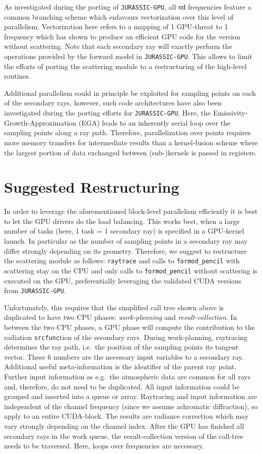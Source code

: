 \documentclass[12pt,a4paper,titlepage,twoside]{article}
\newcommand{\ttt}[1]{\texttt{#1}}
\begin{document}
As investigated during the porting of \ttt{JURASSIC-GPU}, all \ttt{nd} frequencies
feature a common branching scheme which enfavours vectorization over this level of
parallelism. Vectorization here refers to a mapping of 1 GPU-threat to 1 frequency
which has shown to produce an efficient GPU code for the version without scattering.
Note that each secondary ray will exactly perform the operations provided by
the forward model in \ttt{JURASSIC-GPU}.
This allows to limit the efforts of porting the scattering module
to a restructuring of the high-level routines.

Additional parallelism could in principle be exploited for sampling points on each of the secondary rays,
however, such code architectures have also been investigated during the porting efforts 
for \ttt{JURASSIC-GPU}. Here, the Emissivity-Growth-Approximation (EGA) leads
to an inherently serial loop over the sampling points along a ray path.
Therefore, parallelization over points requires more memory transfers for intermediate results than a
kernel-fusion scheme where the largest portion of data exchanged between (sub-)kernels
is passed in registers.


\section{Suggested Restructuring}
In order to leverage the aforementioned block-level parallelism efficiently 
it is best to let the GPU drivers do the load balancing. This works best,
when a large number of tasks (here, 1 task = 1 secondary ray) is specified
in a GPU-kernel launch. 
In particular as the number of sampling points in a secondary ray may differ strongly depending on its geometry. 
Therefore, we suggest to restructure the scattering module as follows:
\ttt{raytrace} and calls to \ttt{formod\_pencil} with scattering stay on
the CPU and only calls to \ttt{formod\_pencil} without scattering
is executed on the GPU, preferentially leveraging the validated CUDA
versions from \ttt{JURASSIC-GPU}.

Unfortunately, this requires that the simplified call tree shown above is
duplicated to have two CPU phases: 
\emph{work-planning} and \emph{result-collection}.
In between the two CPU phases, a GPU phase will compute the contribution
to the radiation \ttt{srcfunc}tion of the secondary rays.
During work-planning, raytracing determines the ray path, i.e.~the position 
of the sampling points its tangent vector. 
These $6$ numbers are the necessary input variables to a secondary ray.
Additional useful meta-information is the identifier of the parent ray point. 
Further input information as e.g.~the atmospheric data are common for all rays
and, therefore, do not need to be duplicated.
All input information could be grouped and inserted into a queue or array.
Raytracing and input information are independent of the channel frequency
(since we assume achromatic diffraction), so apply to an entire CUDA-block.
The results are radiance correction which may vary strongly depending on the
channel index.
After the GPU has finished all secondary rays in the work queue, 
the result-collection version of the
call-tree needs to be traversed.
Here, loops over frequencies are necessary.
\end{document}
